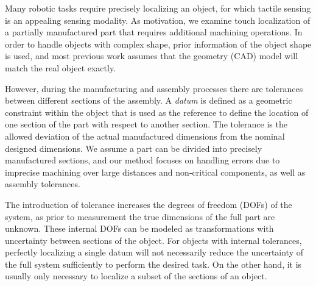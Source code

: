 \documentclass[letterpaper, 10 pt, conference]{ieeeconf}
\begin{document}

Many robotic tasks require precisely localizing an object, for which tactile sensing is an appealing sensing modality.
As motivation, we examine touch localization of a partially manufactured part that requires additional machining operations.
In order to handle objects with complex shape, prior information of the object shape is used, and most previous work assumes that the geometry (CAD) model will match the real object exactly.


However, during the manufacturing and assembly processes there are tolerances between different sections of the assembly. A \textit{datum} is defined as a geometric constraint within the object that is used as the reference to define the location of one section of the part with respect to another section. The tolerance is the allowed deviation of the actual manufactured dimensions from the nominal designed dimensions. We assume a part can be divided into precisely manufactured sections, and our method focuses on handling errors due to imprecise machining over large distances and non-critical components, as well as assembly tolerances.

The introduction of tolerance increases the degrees of freedom (DOFs) of the system, as prior to measurement the true dimensions of the full part are unknown. 
These internal DOFs can be modeled as transformations with uncertainty between sections of the object.
For objects with internal tolerances, perfectly localizing a single datum will not necessarily reduce the uncertainty of the full system sufficiently to perform the desired task.
On the other hand, it is usually only necessary to localize a subset of the sections of an object.
\end{document}
